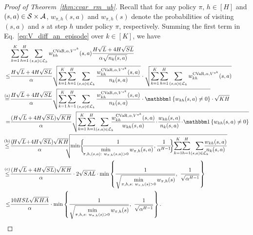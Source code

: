 \begin{proof}[Proof of Theorem~\ref{thm:cvar_rm_ub}]
	Recall that for any policy $\pi$, $h \in [H]$ and $(s,a) \in \mathcal{S} \times \mathcal{A}$, $w_{\pi,h}(s,a)$ and $w_{\pi,h}(s)$ denote the probabilities of visiting $(s,a)$ and $s$ at step $h$ under policy $\pi$, respectively.
	Summing the first term in Eq.~\eqref{eq:V_diff_an_episode} over $k \in [K]$, we have
	\begin{align*}
		& \sum_{k=1}^{K} \sum_{h=1}^{H} \sum_{(s,a) \in \cL_k} w^{\cvar,\alpha,V^{\pi^k}}_{kh}(s,a) \frac{H\sqrt{L}+4H\sqrt{SL}}{\alpha \sqrt{n_k(s,a)}} 
		\\
		\leq & \frac{H\sqrt{L}+4H\sqrt{SL}}{\alpha} \sqrt{ \sum_{k=1}^{K} \sum_{h=1}^{H} \sum_{(s,a) \in \cL_k} \frac{w^{\cvar,\alpha,V^{\pi^k}}_{kh}(s,a)}{n_k(s,a)}} \cdot \sqrt{\sum_{k=1}^{K} \sum_{h=1}^{H} \sum_{(s,a) \in \cL_k} w^{\cvar,\alpha,V^{\pi^k}}_{kh}(s,a)}
		\\
		\overset{\textup{(a)}}{=} & \frac{H\sqrt{L}+4H\sqrt{SL}}{\alpha} \sqrt{ \sum_{k=1}^{K} \sum_{h=1}^{H} \sum_{(s,a) \in \cL_k} \frac{w^{\cvar,\alpha,V^{\pi^k}}_{kh}(s,a)}{n_k(s,a)} \cdot \indicator{w_{kh}(s,a) \neq 0} } \cdot \sqrt{KH}
		\\
		= & \frac{ (H\sqrt{L}+4H\sqrt{SL}) \sqrt{KH} }{\alpha}   \sqrt{ \sum_{k=1}^{K} \sum_{h=1}^{H} \! \sum_{(s,a) \in \cL_k} \!\!\!\! \frac{w^{\cvar,\alpha,V^{\pi^k}}_{kh}(s,a)}{w_{kh}(s,a)} \!\cdot\! \frac{w_{kh}(s,a)}{n_k(s,a)} \!\cdot\! \indicator{w_{kh}(s,a) \neq 0} } 
		\\
		\overset{\textup{(b)}}{\leq} & \frac{ (\! H\sqrt{L} \!+\! 4H\sqrt{SL}) \sqrt{KH}}{\alpha} \!\!\!\! \sqrt{ \!\min \!\bigg\{\!\! \frac{1}{\min \limits_{\begin{subarray}{c}\pi,h,(s,a):\ w_{\pi,h}(s,a)>0\end{subarray}} w_{\pi,h}(s,a)}, \frac{1}{\alpha^{H-1}} \!\!\bigg\} \! \sum_{k=1}^{K} \! \sum_{h=1}^{H} \! \sum_{(s,a) \in \cL_k} \!\!\!\!\!\! \frac{w_{kh}(s,a)}{n_k(s,a)} } 
		\\
		\overset{\textup{(c)}}{\leq} & \frac{(H\sqrt{L}+4H\sqrt{SL}) \sqrt{KH}}{\alpha} \cdot 2\sqrt{SAL} \cdot \min \lbr{ \frac{1}{\sqrt{\min \limits_{\begin{subarray}{c}\pi,h,s:\  w_{\pi,h}(s)>0\end{subarray}} w_{\pi,h}(s)}},\ \frac{1}{\sqrt{\alpha^{H-1}}} }
		\\
		\leq & \frac{ 10HSL \sqrt{KHA} }{\alpha} \cdot \min \lbr{ \frac{1}{\sqrt{\min \limits_{\begin{subarray}{c}\pi,h,s:\  w_{\pi,h}(s)>0\end{subarray}} w_{\pi,h}(s)}},\ \frac{1}{\sqrt{\alpha^{H-1}}} } .

\end{align*}
\end{proof}
